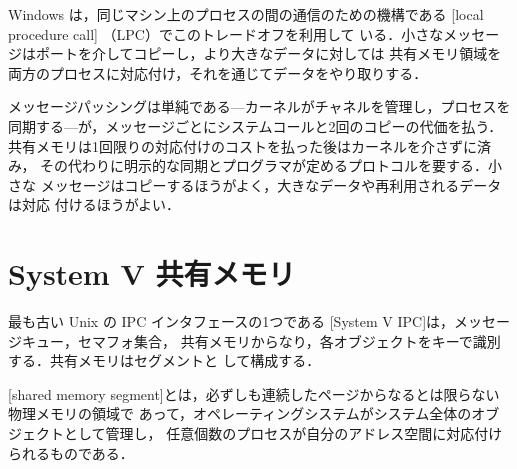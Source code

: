\documentclass[../main.tex]{subfiles}
\begin{document}
Windows は，同じマシン上のプロセスの間の通信のための機構である
[local procedure call]
（LPC）でこのトレードオフを利用して
いる．小さなメッセージはポートを介してコピーし，より大きなデータに対しては
共有メモリ領域を両方のプロセスに対応付け，それを通じてデータをやり取りする．

\begin{keypoint}
  メッセージパッシングは単純である---カーネルがチャネルを管理し，プロセスを
  同期する---が，メッセージごとにシステムコールと2回のコピーの代価を払う．
  共有メモリは1回限りの対応付けのコストを払った後はカーネルを介さずに済み，
  その代わりに明示的な同期とプログラマが定めるプロトコルを要する．小さな
  メッセージはコピーするほうがよく，大きなデータや再利用されるデータは対応
  付けるほうがよい．
\end{keypoint}

\section{System V 共有メモリ}
\label{sec:l09-sysv}

最も古い Unix の IPC インタフェースの1つである
[System V IPC]は，メッセージキュー，セマフォ集合，
共有メモリからなり，各オブジェクトをキーで識別する．共有メモリはセグメントと
して構成する．

\begin{definition}[共有メモリセグメント]
  [shared memory
  segment]とは，必ずしも連続したページからなるとは限らない物理メモリの領域で
  あって，オペレーティングシステムがシステム全体のオブジェクトとして管理し，
  任意個数のプロセスが自分のアドレス空間に対応付けられるものである．
\end{definition}
\end{document}
